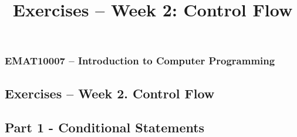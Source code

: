 \documentclass[11pt]{report}
\begin{document}
\title{Exercises -- Week 2: Control Flow}
\subsubsection*{EMAT10007 -- Introduction to Computer Programming}
\subsection*{\Large Exercises -- Week 2. Control Flow}

\subsection*{\Large Part 1 - Conditional Statements}

\end{document}
